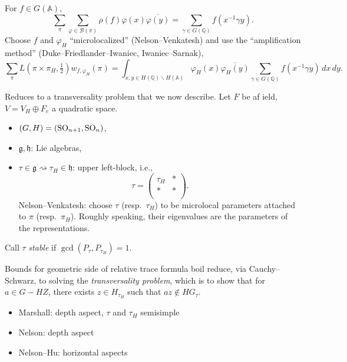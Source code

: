 \documentclass[reqno]{amsart} 
\begin{document}
For $f \in G(\mathbb{A})$,
\begin{equation*}
  \sum_\pi \sum_{\varphi \in \mathcal{B}(\pi)}
  \rho(f) \varphi(x) \overline{\varphi(y)}
  = \sum_{\gamma \in G(\mathbb{Q})}
  f(x^{-1} \gamma y).
\end{equation*}
Choose $f$ and $\varphi_H$ ``microlocalized'' (Nelson--Venkatesh) and use the ``amplification method'' (Duke--Friedlander--Iwaniec, Iwaniec--Sarnak),
\begin{equation*}
  \sum_\pi L(\pi \times \pi_H, \tfrac{1}{2}) w_{f, \varphi_H}(\pi)
  = \int_{x, y \in H(\mathbb{Q}) \backslash H(\mathbb{A})}
  \varphi_H(x) \overline{\varphi_H(y)}
  \sum_{\gamma \in G(\mathbb{Q})} f(x^{-1} \gamma y) \, d x \, d y.
\end{equation*}

Reduces to a transversality problem that we now describe.  Let $F$ be af ield, $V =  V_H \oplus F_e$ a quadratic space.
\begin{itemize}
\item $(G, H) =(\operatorname{SO}_{n + 1}, \operatorname{SO}_n)$,
\item $\mathfrak{g}, \mathfrak{h}$: Lie algebras,
\item $\tau \in \mathfrak{g} \rightsquigarrow \tau_H \in \mathfrak{h}$: upper left-block, i.e.,
  \begin{equation*}
    \tau =
    \begin{pmatrix}
      \tau_H      & \ast \\
      \ast                  & \ast \\
    \end{pmatrix}.
  \end{equation*}
  Nelson--Venkatesh: choose $\tau$ (resp.\ $\tau_H$) to be microlocal parameters attached to $\pi$ (resp.\ $\pi_H$).  Roughly speaking, their eigenvalues are the parameters of the representations.
\end{itemize}

Call $\tau$ \emph{stable} if $\gcd(P_\tau, P_{\tau_H}) = 1$.

Bounds for geometric side of relative trace formula boil reduce, via Cauchy--Schwarz, to solving the \emph{transversality problem}, which is to show that for $a \in G - H Z$, there exists $z \in H_{\tau_H}$ such that $a z \notin H G_\tau$.
\begin{itemize}
\item Marshall: depth aspect, $\tau$ and $\tau_H$ semisimple
\item Nelson: depth aspect
\item Nelson--Hu: horizontal aspects
\end{itemize}
\end{document}

